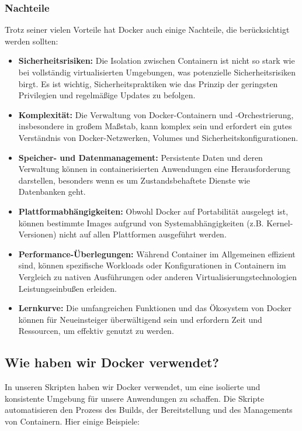 \subsubsection{Nachteile}

Trotz seiner vielen Vorteile hat Docker auch einige Nachteile, die berücksichtigt werden sollten:

\begin{itemize}
    \item \textbf{Sicherheitsrisiken:} Die Isolation zwischen Containern ist nicht so stark wie bei vollständig virtualisierten Umgebungen, was potenzielle Sicherheitsrisiken birgt. Es ist wichtig, Sicherheitspraktiken wie das Prinzip der geringsten Privilegien und regelmäßige Updates zu befolgen.
    \item \textbf{Komplexität:} Die Verwaltung von Docker-Containern und -Orchestrierung, insbesondere in großem Maßstab, kann komplex sein und erfordert ein gutes Verständnis von Docker-Netzwerken, Volumes und Sicherheitskonfigurationen.
    \item \textbf{Speicher- und Datenmanagement:} Persistente Daten und deren Verwaltung können in containerisierten Anwendungen eine Herausforderung darstellen, besonders wenn es um Zustandsbehaftete Dienste wie Datenbanken geht.
    \item \textbf{Plattformabhängigkeiten:} Obwohl Docker auf Portabilität ausgelegt ist, können bestimmte Images aufgrund von Systemabhängigkeiten (z.B. Kernel-Versionen) nicht auf allen Plattformen ausgeführt werden.
    \item \textbf{Performance-Überlegungen:} Während Container im Allgemeinen effizient sind, können spezifische Workloads oder Konfigurationen in Containern im Vergleich zu nativen Ausführungen oder anderen Virtualisierungstechnologien Leistungseinbußen erleiden.
    \item \textbf{Lernkurve:} Die umfangreichen Funktionen und das Ökosystem von Docker können für Neueinsteiger überwältigend sein und erfordern Zeit und Ressourcen, um effektiv genutzt zu werden.
\end{itemize}

\subsection{Wie haben wir Docker verwendet?}

In unseren Skripten haben wir Docker verwendet, um eine isolierte und konsistente Umgebung für unsere Anwendungen zu schaffen. Die Skripte automatisieren den Prozess des Builds, der Bereitstellung und des Managements von Containern. Hier einige Beispiele:

